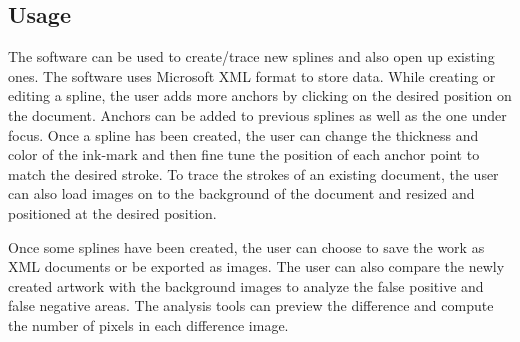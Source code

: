 \subsection{Usage}
{
    The software can be used to create/trace new splines and also open up existing ones. The software uses Microsoft XML format to store data. While creating or editing a spline, the user adds more anchors by clicking on the desired position on the document. Anchors can be added to previous splines as well as the one under focus. Once a spline has been created, the user can change the thickness and color of the ink-mark and then fine tune the position of each anchor point to match the desired stroke. To trace the strokes of an existing document, the user can also load images on to the background of the document and resized and positioned at the desired position.

    Once some splines have been created, the user can choose to save the work as XML documents or be exported as images. The user can also compare the newly created artwork with the background images to analyze the false positive and false negative areas. The analysis tools can preview the difference and compute the number of pixels in each difference image.
}

